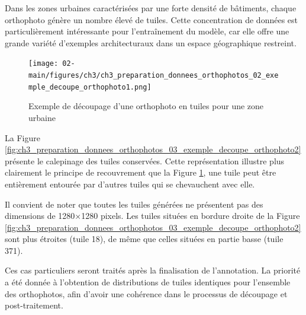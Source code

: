 Dans les zones urbaines caractérisées par une forte densité de bâtiments, chaque orthophoto génère un nombre élevé de tuiles. Cette concentration de données est particulièrement intéressante pour l'entraînement du modèle, car elle offre une grande variété d'exemples architecturaux dans un espace géographique restreint.

\begin{figure}[H]
    \centering
    \texttt{[image: 02-main/figures/ch3/ch3\_preparation\_donnees\_orthophotos\_02\_exemple\_decoupe\_orthophoto1.png]}
    \caption{Exemple de découpage d'une orthophoto en tuiles pour une zone urbaine}
    \label{fig:ch3_preparation_donnees_orthophotos_02_exemple_decoupe_orthophoto1}
\end{figure}

\newpage
La Figure \ref{fig:ch3_preparation_donnees_orthophotos_03_exemple_decoupe_orthophoto2} présente le calepinage des tuiles conservées. Cette représentation illustre plus clairement le principe de recouvrement que la Figure \ref{fig:ch3_preparation_donnees_orthophotos_02_exemple_decoupe_orthophoto1}, une tuile peut être entièrement entourée par d'autres tuiles qui se chevauchent avec elle.

Il convient de noter que toutes les tuiles générées ne présentent pas des dimensions de 1280×1280 pixels. Les tuiles situées en bordure droite de la Figure \ref{fig:ch3_preparation_donnees_orthophotos_03_exemple_decoupe_orthophoto2} sont plus étroites (tuile 18), de même que celles situées en partie basse (tuile 371).

Ces cas particuliers seront traités après la finalisation de l'annotation. La priorité a été donnée à l'obtention de distributions de tuiles identiques pour l'ensemble des orthophotos, afin d'avoir une cohérence dans le processus de découpage et post-traitement.


